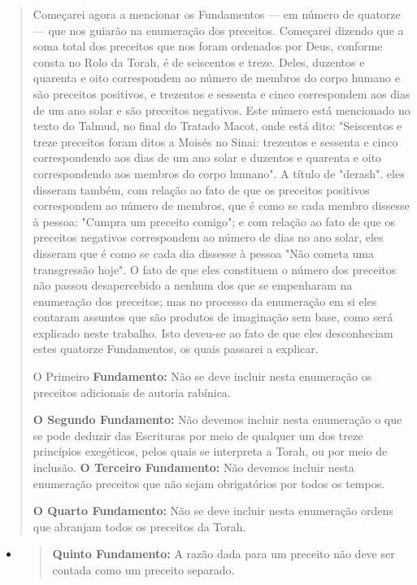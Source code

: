\begin{quote}
Começarei agora a mencionar os Fundamentos --- em número de qua­torze
--- que nos guiarão na enumeração dos preceitos. Começarei dizendo que a
soma total dos preceitos que nos foram ordenados por Deus, conforme
cons­ta no Rolo da Torah, é de seiscentos e treze. Deles, duzentos e
quarenta e oito correspondem ao número de membros do corpo humano e são
preceitos posi­tivos, e trezentos e sessenta e cinco correspondem aos
dias de um ano solar e são preceitos negativos. Este número está
mencionado no texto do Talmud, no final do Tratado Macot, onde está
dito: "Seiscentos e treze preceitos foram ditos a Moisés no Sinai:
trezentos e sessenta e cinco correspondendo aos dias de um ano solar e
duzentos e quarenta e oito correspondendo aos membros do corpo humano".
A título de "derash". eles disseram também, com
relação ao fato de que os preceitos positivos correspondem ao número de
membros, que é como se cada membro dissesse à pessoa: "Cumpra um
preceito comi­go"; e com relação ao fato de que os preceitos negativos
correspondem ao nú­mero de dias no ano solar, eles disseram que é como
se cada dia dissesse à pes­soa "Não cometa uma transgressão hoje". O
fato de que eles constituem o nú­mero dos preceitos não passou
desapercebido a nenhum dos que se empenha­ram na enumeração dos
preceitos; mas no processo da enumeração em si eles contaram assuntos
que são produtos de imaginação sem base, como será expli­cado neste
trabalho. Isto deveu-se ao fato de que eles desconheciam estes qua­torze
Fundamentos, os quais passarei a explicar.

O Primeiro \textbf{Fundamento:} Não se deve incluir nesta enumeração os
preceitos adicionais de autoria rabínica.

\textbf{O Segundo Fundamento:} Não devemos incluir nesta enumeração o
que se po­de deduzir das Escrituras por meio de qualquer um dos treze
princípios exegé­ticos, pelos quais se interpreta a Torah, ou por meio
de inclusão.
\textbf{O Terceiro Fundamento:} Não devemos incluir nesta enumeração
preceitos que não sejam obrigatórios por todos os tempos.

\textbf{O Quarto Fundamento:} Não se deve incluir nesta enumeração
ordens que abran­jam todos os preceitos da Torah.
\end{quote}

\begin{itemize}
\item
 \begin{quote}
 \textbf{Quinto Fundamento:} A razão dada para um preceito não deve ser
 contada como um preceito separado.
 \end{quote}
\end{itemize}

